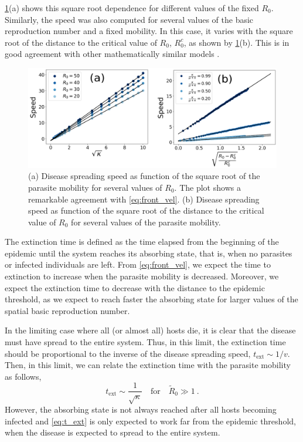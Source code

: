 \cref{fig:front_velocity}(a) shows this square root dependence for
different values of the fixed $R_0$. Similarly, the speed was also computed for
several values of the basic reproduction number and a fixed mobility. In this
case, it varies with the square root of the distance to the critical value of
$R_0$, $R_0^c$, as shown by \cref{fig:front_velocity}(b). This is in good
agreement with other mathematically similar models \cite{Bertuzzo2010}.

\begin{figure}[H]
    \centering
    \includegraphics[width=1\textwidth]{Figures/Front_velocity.png}
    \caption{(a) Disease spreading speed as function of the square root of
        the parasite mobility for several values of $R_0$. The plot shows a
        remarkable
        agreement with \cref{eq:front_vel}. (b) Disease spreading speed as
        function of
        the square root of the distance to the critical value of $R_0$ for
        several
        values of the parasite mobility.}
    \label{fig:front_velocity}
\end{figure}

The extinction time is defined as the time elapsed from the beginning of
the epidemic until the system reaches its absorbing state, that is, when no
parasites or infected individuals are left. From \cref{eq:front_vel}, we expect
the time to extinction to increase when the parasite mobility is decreased.
Moreover, we expect the extinction time to decrease with the distance to the
epidemic threshold, as we expect to reach faster the absorbing state for larger
values of the spatial basic reproduction number.

In the limiting case where all (or almost all) hosts die, it is clear that
the disease must have spread to the entire system. Thus, in this limit, the
extinction time should be proportional to the inverse of the disease spreading
speed, $t_{\textrm{ext}}\sim 1/v$. Then, in this limit, we can relate the
extinction time with the parasite mobility as follows,
\begin{equation}\label{eq:t_ext}
    t_{\textrm{ext}}\sim\frac{1}{\sqrt{\kappa}} \quad \textrm{for} \quad
    \tilde{R}_0\gg1 \ .
\end{equation}
However, the absorbing state is not always reached after all hosts becoming
infected and \cref{eq:t_ext} is only expected to work far from the epidemic
threshold, when the disease is expected to spread to the entire system.

